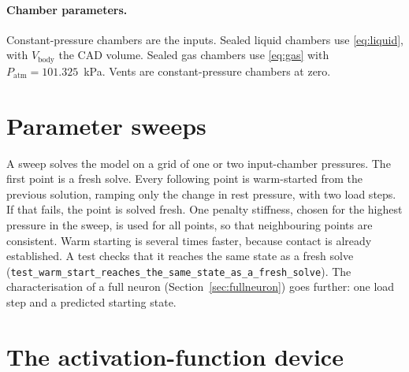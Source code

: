 \documentclass[11pt,a4paper]{article}
\newcommand{\code}[1]{\texttt{#1}}
\theoremstyle{remark}
\begin{document}
\paragraph{Chamber parameters.} Constant-pressure chambers are the inputs. Sealed liquid chambers
use \eqref{eq:liquid}, with $V_{\text{body}}$ the CAD volume. Sealed gas chambers use
\eqref{eq:gas} with $P_{\text{atm}} = 101.325$~kPa. Vents are constant-pressure chambers at zero.

\section{Parameter sweeps}\label{sec:sweep}

A sweep solves the model on a grid of one or two input-chamber pressures. The first point is a
fresh solve. Every following point is warm-started from the previous solution, ramping only the
change in rest pressure, with two load steps. If that fails, the point is solved fresh. One
penalty stiffness, chosen for the highest pressure in the sweep, is used for all points, so that
neighbouring points are consistent. Warm starting is several times faster, because contact is
already established. A test checks that it reaches the same state as a fresh solve
(\code{test\_warm\_start\_reaches\_the\_same\_state\_as\_a\_fresh\_solve}). The characterisation of a
full neuron (Section~\ref{sec:fullneuron}) goes further: one load step and a predicted starting state.

\section{The activation-function device}\label{sec:activation}
\end{document}
